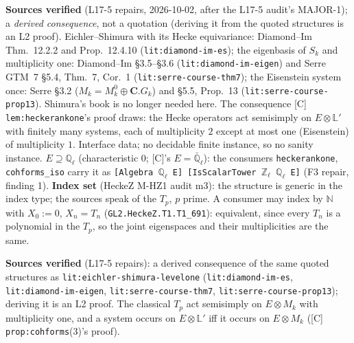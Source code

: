 \begin{hypothesis}\label{lit:eichler-shimura-levelone}
   \leanok
  \textbf{Sources verified} (L17-5 repairs, 2026-10-02, after the L17-5 audit's MAJOR-1); a \emph{derived consequence}, not a
  quotation (deriving it from the quoted structures is an L2 proof). Eichler--Shimura with its Hecke equivariance:
  Diamond--Im Thm.~12.2.2 and Prop.~12.4.10 (\texttt{lit:diamond-im-es}); the eigenbasis of $S_k$ and multiplicity one:
  Diamond--Im \S3.5--\S3.6 (\texttt{lit:diamond-im-eigen}) and Serre GTM~7 \S5.4, Thm.~7, Cor.~1 (\texttt{lit:serre-course-thm7});
  the Eisenstein system once: Serre \S3.2 ($M_k=M^0_k\oplus\mathbf C.G_k$) and \S5.5, Prop.~13 (\texttt{lit:serre-course-prop13}).
  Shimura's book is no longer needed here. The consequence
  [C] \texttt{lem:heckerankone}'s proof draws: the Hecke operators act semisimply on $E\otimes\mathbb L'$ with finitely many
  systems, each of multiplicity $2$ except at most one (Eisenstein) of multiplicity $1$. Interface data; no decidable
  finite instance, so no sanity instance. \textbf{$E\supseteq\mathbb Q_\ell$} (characteristic $0$; [C]'s $E=\bar{\mathbb Q}_\ell$):
  the consumers \texttt{heckerankone}, \texttt{cohforms\_iso} carry it as \texttt{[Algebra $\mathbb Q_\ell$ E]
  [IsScalarTower $\mathbb Z_\ell$ $\mathbb Q_\ell$ E]} (F3 repair, finding 1). \textbf{Index set} (HeckeZ M-HZ1 audit m3): the structure
  is generic in the index type; the sources speak of the $T_p$, $p$ prime. A consumer may index by $\mathbb N$ with $X_0:=0$, $X_n=T_n$
  (\texttt{GL2.HeckeZ.T1.T1\_691}): equivalent, since every $T_n$ is a polynomial in the $T_p$, so the joint eigenspaces and their
  multiplicities are the same.
\end{hypothesis}

\begin{hypothesis}\label{lit:forms-same-systems}
   \leanok
  \textbf{Sources verified} (L17-5 repairs): a derived consequence of the same quoted structures as
  \texttt{lit:eichler-shimura-levelone} (\texttt{lit:diamond-im-es}, \texttt{lit:diamond-im-eigen}, \texttt{lit:serre-course-thm7},
  \texttt{lit:serre-course-prop13}); deriving it is an L2 proof. The classical $T_p$ act semisimply on $E\otimes M_k$ with
  multiplicity one, and a system occurs on $E\otimes\mathbb L'$ iff it occurs on $E\otimes M_k$ ([C]
  \texttt{prop:cohforms}(3)'s proof).
\end{hypothesis}

